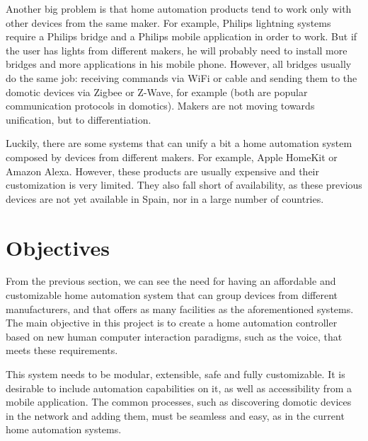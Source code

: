 Another big problem is that home automation products tend to work only with other devices from the same maker. For example, Philips
lightning systems require a Philips bridge and a Philips mobile application in order to work. But if the user has lights from different
makers, he will probably need to install more bridges and more applications in his mobile phone. However, all bridges usually do the same
job: receiving commands via WiFi or cable and sending them to the domotic devices via Zigbee or Z-Wave, for example (both are popular
communication protocols in domotics). Makers are not moving towards unification, but to differentiation.

Luckily, there are some systems that can unify a bit a home automation system composed by devices from different makers. For example,
Apple HomeKit\cite{appleIOSHome} or Amazon Alexa\cite{amazonAlexa}. However, these products are usually expensive and their 
customization is very limited. They also fall short of availability, as these previous devices are not yet available in Spain, nor 
in a large number of countries.

\bigskip
\section{Objectives}
From the previous section, we can see the need for having an affordable and customizable home automation system that can group 
devices from different manufacturers, and that offers as many facilities as the aforementioned systems. The main objective in this 
project is to create a home automation controller based on new human computer interaction paradigms, such as the voice, that meets
these requirements.

This system needs to be modular, extensible, safe and fully customizable. It is desirable to include automation capabilities on it, 
as well as accessibility from a mobile application. The common processes, such as discovering domotic devices in the network and
adding them, must be seamless and easy, as in the current home automation systems.

